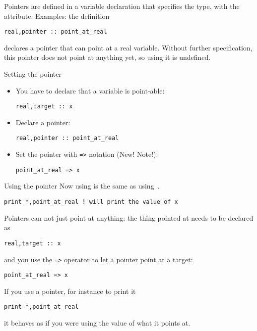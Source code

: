 Pointers are defined in a variable declaration
that specifies the type, with the  attribute.
Examples: the definition
\begin{lstlisting}
real,pointer :: point_at_real
\end{lstlisting}
declares a pointer that can point at a real variable.
Without further specification, this pointer
does not point at anything yet,
so using it is undefined.

\begin{block}{Setting the pointer}
  \label{sl:fpoint-set}
  \begin{itemize}
  \item You have to declare that a variable is point-able:
\begin{lstlisting}
real,target :: x
\end{lstlisting}
\item Declare a pointer:
\begin{lstlisting}
real,pointer :: point_at_real
\end{lstlisting}
\item Set the pointer with \verb+=>+ notation (New! Note!):
\begin{lstlisting}
point_at_real => x
\end{lstlisting}
  \end{itemize}
\end{block}

\begin{block}{Using the pointer}
  \label{sl:fpoint-use}
Now using  is the same as using~.
\begin{lstlisting}
print *,point_at_real ! will print the value of x
\end{lstlisting}
\end{block}

Pointers can not just point at anything: the thing pointed at needs to
be declared as 
\begin{lstlisting}
real,target :: x
\end{lstlisting}
and you use the \verb+=>+ operator to let a pointer point at a target:
\begin{lstlisting}
point_at_real => x
\end{lstlisting}

If you use a pointer, for instance to print it
\begin{lstlisting}
print *,point_at_real
\end{lstlisting}
it behaves as if you were using the value of what it points at.

